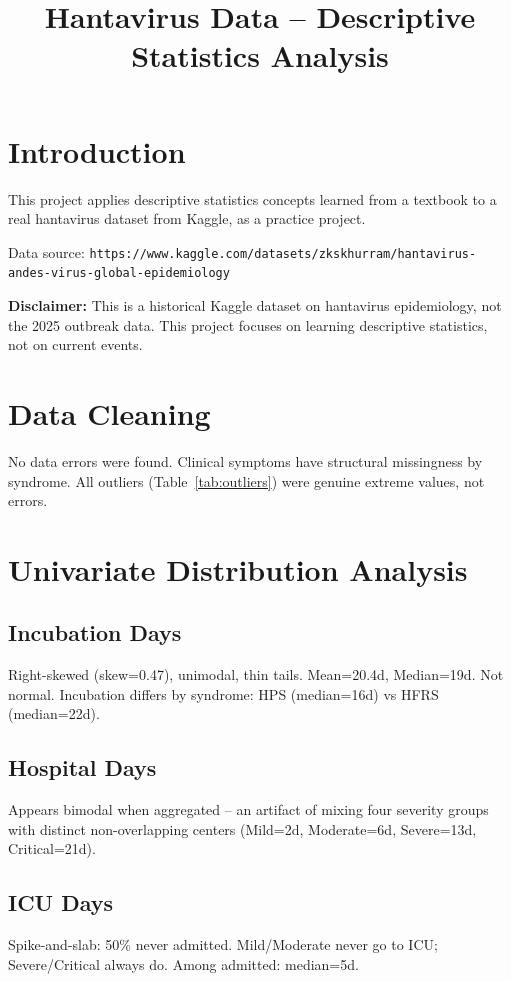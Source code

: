 \documentclass[11pt,a4paper]{article}
\title{Hantavirus Data -- Descriptive Statistics Analysis}
\author{}
\date{}
\begin{document}
\maketitle
\thispagestyle{empty}

\section{Introduction}

This project applies descriptive statistics concepts learned from a textbook to a real
hantavirus dataset from Kaggle, as a practice project.

Data source: \texttt{https://www.kaggle.com/datasets/zkskhurram/hantavirus-andes-virus-global-epidemiology}

\noindent\textbf{Disclaimer:} This is a historical Kaggle dataset on hantavirus epidemiology, not the 2025 outbreak data. This project focuses on learning descriptive statistics, not on current events.

\section{Data Cleaning}

No data errors were found. Clinical symptoms have structural missingness by syndrome.
All outliers (Table~\ref{tab:outliers}) were genuine extreme values, not errors.

\section{Univariate Distribution Analysis}

\subsection{Incubation Days}
Right-skewed (skew=0.47), unimodal, thin tails. Mean=20.4d, Median=19d.
Not normal. Incubation differs by syndrome: HPS (median=16d) vs HFRS (median=22d).

\subsection{Hospital Days}
Appears bimodal when aggregated -- an artifact of mixing four severity groups with
distinct non-overlapping centers (Mild=2d, Moderate=6d, Severe=13d, Critical=21d).

\subsection{ICU Days}
Spike-and-slab: 50\% never admitted. Mild/Moderate never go to ICU;
Severe/Critical always do. Among admitted: median=5d.
\end{document}
